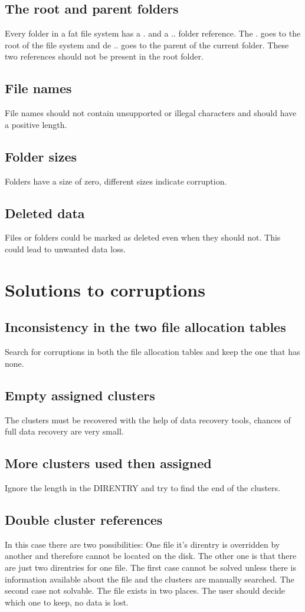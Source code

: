 \documentclass[pdftex,12pt,a4paper]{article}
\begin{document}
\subsection{The root and parent folders}
Every folder in a fat file system has a . and a .. folder reference. The . goes to the root of the file system and de .. goes to the parent of the current folder. These two references should not be present in the root folder.
\subsection{File names}
File names should not contain unsupported or illegal characters and should have a positive length.
\subsection{Folder sizes}
Folders have a size of zero, different sizes indicate corruption.
\subsection{Deleted data}
Files or folders could be marked as deleted even when they should not. This could lead to unwanted data loss. 

\section{Solutions to corruptions}
\subsection{Inconsistency in the two file allocation tables}
Search for corruptions in both the file allocation tables and keep the one that has none.
\subsection{Empty assigned clusters}
The clusters must be recovered with the help of data recovery tools, chances of full data recovery are very small.
\subsection{More clusters used then assigned}
Ignore the length in the DIRENTRY and try to find the end of the clusters.
\subsection{Double cluster references}
In this case there are two possibilities: One file it's direntry is overridden by another and therefore cannot be located on the disk. The other one is that there are just two direntries for one file. The first case cannot be solved unless there is information available about the file and the clusters are manually searched. The second case not solvable. The file exists in two places. The user should decide which one to keep, no data is lost.
\end{document}
